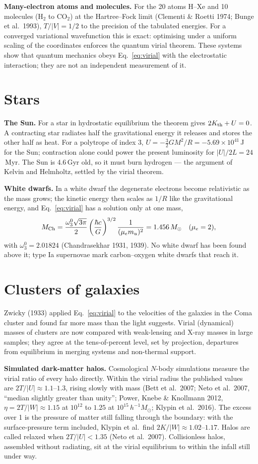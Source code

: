 \documentclass[11pt,a4paper]{article}
\begin{document}
\textbf{Many-electron atoms and molecules.} For the 20 atoms H--Xe and 10 molecules (H$_2$ to CO$_2$) at the Hartree--Fock limit (Clementi \& Roetti 1974;
Bunge et al.\ 1993), $T/|V|=1/2$ to the precision of the tabulated energies. For a converged variational wavefunction this is exact: optimising under a uniform
scaling of the coordinates enforces the quantum virial theorem. These systems show that quantum mechanics obeys Eq.~\eqref{eq:virial} with the electrostatic
interaction; they are not an independent measurement of it.

\section{Stars}
\textbf{The Sun.} For a star in hydrostatic equilibrium the theorem gives $2K_{\rm th}+U=0$. A contracting star radiates half the gravitational energy it
releases and stores the other half as heat. For a polytrope of index 3, $U=-\tfrac32GM^2/R=-5.69\times10^{41}$\,J for the Sun; contraction alone could
power the present luminosity for $|U|/2L=24$\,Myr. The Sun is 4.6\,Gyr old, so it must burn hydrogen --- the argument of Kelvin and Helmholtz, settled by the
virial theorem.

\textbf{White dwarfs.} In a white dwarf the degenerate electrons become relativistic as the mass grows; the kinetic energy then scales as $1/R$ like the
gravitational energy, and Eq.~\eqref{eq:virial} has a solution only at one mass,
\begin{equation}
M_{\rm Ch}=\frac{\omega_3^0\sqrt{3\pi}}{2}\left(\frac{\hbar c}{G}\right)^{3/2}\frac{1}{(\mu_em_u)^2}=1.456\,M_\odot\quad(\mu_e=2),
\end{equation}
with $\omega_3^0=2.01824$ (Chandrasekhar 1931, 1939). No white dwarf has been found above it; type Ia supernovae mark carbon--oxygen white dwarfs that reach it.

\section{Clusters of galaxies}
Zwicky (1933) applied Eq.~\eqref{eq:virial} to the velocities of the galaxies in the Coma cluster and found far more mass than the light suggests. Virial
(dynamical) masses of clusters are now compared with weak-lensing and X-ray masses in large samples; they agree at the tens-of-percent level, set by
projection, departures from equilibrium in merging systems and non-thermal support.

\textbf{Simulated dark-matter halos.} Cosmological $N$-body simulations measure the virial ratio of every halo directly. Within the virial radius the
published values are $2T/|U|\approx1.1$--$1.3$, rising slowly with mass (Bett et al.\ 2007; Neto et al.\ 2007, ``median slightly greater than unity'';
Power, Knebe \& Knollmann 2012, $\eta=2T/|W|\approx1.15$ at $10^{12}$ to $1.25$ at $10^{15}\,h^{-1}M_\odot$; Klypin et al.\ 2016). The excess over 1 is the
pressure of matter still falling through the boundary: with the surface-pressure term included, Klypin et al.\ find $2K/|W|\approx1.02$--$1.17$. Halos are
called relaxed when $2T/|U|<1.35$ (Neto et al.\ 2007). Collisionless halos, assembled without radiating, sit at the virial equilibrium to within the
infall still under way.
\end{document}
